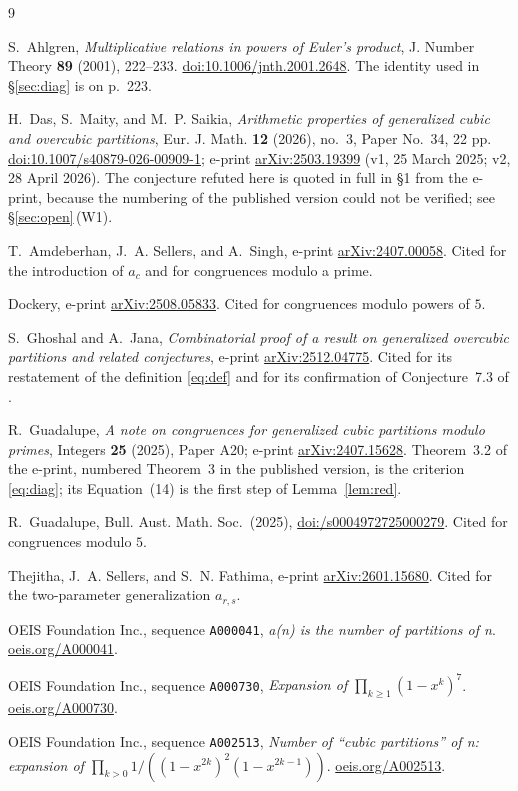 \documentclass[11pt]{amsart}
\theoremstyle{definition}
\theoremstyle{remark}
\begin{document}
\begin{thebibliography}{9}

S.~Ahlgren,
\emph{Multiplicative relations in powers of Euler's product},
J. Number Theory \textbf{89} (2001), 222--233.
\href{https://doi.org/10.1006/jnth.2001.2648}{doi:10.1006/jnth.2001.2648}.
The identity used in \S\ref{sec:diag} is on p.~223.

H.~Das, S.~Maity, and M.~P. Saikia,
\emph{Arithmetic properties of generalized cubic and overcubic partitions},
Eur. J. Math. \textbf{12} (2026), no.~3, Paper No.~34, 22 pp.
\href{https://doi.org/10.1007/s40879-026-00909-1}{doi:10.1007/s40879-026-00909-1};
e-print \href{https://arxiv.org/abs/2503.19399}{arXiv:2503.19399}
(v1, 25 March 2025; v2, 28 April 2026). The conjecture refuted here is quoted in full in
\S1 from the e-print, because the numbering of the published version could not be
verified; see \S\ref{sec:open}\,(W1).

T.~Amdeberhan, J.~A. Sellers, and A.~Singh,
e-print \href{https://arxiv.org/abs/2407.00058}{arXiv:2407.00058}.
Cited for the introduction of $a_c$ and for congruences modulo a prime.

Dockery,
e-print \href{https://arxiv.org/abs/2508.05833}{arXiv:2508.05833}.
Cited for congruences modulo powers of $5$.

S.~Ghoshal and A.~Jana,
\emph{Combinatorial proof of a result on generalized overcubic partitions and related
conjectures},
e-print \href{https://arxiv.org/abs/2512.04775}{arXiv:2512.04775}.
Cited for its restatement of the definition \eqref{eq:def} and for its confirmation of
Conjecture~7.3 of \cite{DMS}.

R.~Guadalupe,
\emph{A note on congruences for generalized cubic partitions modulo primes},
Integers \textbf{25} (2025), Paper A20; e-print
\href{https://arxiv.org/abs/2407.15628}{arXiv:2407.15628}.
Theorem~3.2 of the e-print, numbered Theorem~3 in the published version, is the criterion
\eqref{eq:diag}; its Equation~(14) is the first step of Lemma~\ref{lem:red}.

R.~Guadalupe,
Bull. Aust. Math. Soc.\ (2025),
\href{https://doi.org/10.1017/s0004972725000279}{doi:/\allowbreak s0004972725000279}. Cited for congruences modulo $5$.

Thejitha, J.~A. Sellers, and S.~N. Fathima,
e-print \href{https://arxiv.org/abs/2601.15680}{arXiv:2601.15680}.
Cited for the two-parameter generalization $a_{r,s}$.

OEIS Foundation Inc., sequence \texttt{A000041}, \emph{a(n) is the number of partitions of
n}. \href{https://oeis.org/A000041}{oeis.org/A000041}.

OEIS Foundation Inc., sequence \texttt{A000730}, \emph{Expansion of
$\prod_{k\ge1}(1-x^k)^7$}. \href{https://oeis.org/A000730}{oeis.org/A000730}.

OEIS Foundation Inc., sequence \texttt{A002513}, \emph{Number of ``cubic partitions'' of
n: expansion of $\prod_{k>0}1/((1-x^{2k})^2(1-x^{2k-1}))$}.
\href{https://oeis.org/A002513}{oeis.org/A002513}.

\end{thebibliography}
\end{document}
